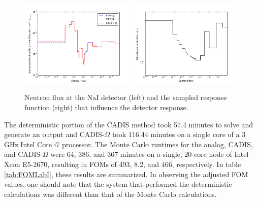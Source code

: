 \documentclass[12pt]{article}
\begin{document}
\begin{figure}
  \begin{center}
    \includegraphics[width=0.49\textwidth]{./images/flux.png}
    \includegraphics[width=0.49\textwidth]{./images/response_function.png}
    \caption[]{\label{fig::tallyproducts} Neutron flux at the NaI detector (left) and the sampled response function (right) that influence the detector response. }
  \end{center}
\end{figure}

The deterministic portion of the CADIS method took 57.4 minutes to solve and generate an output and CADIS-$\Omega$ took 116.44 minutes on a single core of a 3 GHz Intel Core i7 processor. The Monte Carlo runtimes for the analog, CADIS, and CADIS-$\Omega$ were 64, 386, and 367 minutes on a single, 20-core node of Intel Xeon E5-2670, resulting in FOMs of 493, 8.2, and 466, respectively.  In table \ref{tab:FOMLabI}, these results are summarized. In observing the adjusted FOM values, one should note that the system that performed the deterministic calculations was different than that of the Monte Carlo calculations. 
\end{document}
